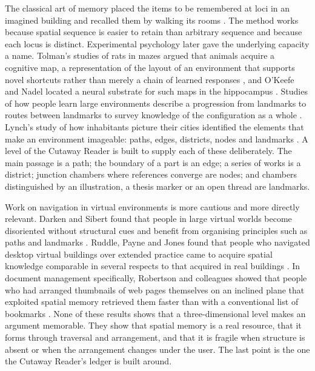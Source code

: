 \documentclass[11pt]{article}
\theoremstyle{remark}
\begin{document}
The classical art of memory placed the items to be remembered at loci in an imagined building and recalled them by walking its rooms \cite{yates1966}. The method works because spatial sequence is easier to retain than arbitrary sequence and because each locus is distinct. Experimental psychology later gave the underlying capacity a name. Tolman's studies of rats in mazes argued that animals acquire a cognitive map, a representation of the layout of an environment that supports novel shortcuts rather than merely a chain of learned responses \cite{tolman1948}, and O'Keefe and Nadel located a neural substrate for such maps in the hippocampus \cite{okeefe1978}. Studies of how people learn large environments describe a progression from landmarks to routes between landmarks to survey knowledge of the configuration as a whole \cite{siegel1975}. Lynch's study of how inhabitants picture their cities identified the elements that make an environment imageable: paths, edges, districts, nodes and landmarks \cite{lynch1960}. A level of the Cutaway Reader is built to supply each of these deliberately. The main passage is a path; the boundary of a part is an edge; a series of works is a district; junction chambers where references converge are nodes; and chambers distinguished by an illustration, a thesis marker or an open thread are landmarks.

Work on navigation in virtual environments is more cautious and more directly relevant. Darken and Sibert found that people in large virtual worlds become disoriented without structural cues and benefit from organising principles such as paths and landmarks \cite{darken1996}. Ruddle, Payne and Jones found that people who navigated desktop virtual buildings over extended practice came to acquire spatial knowledge comparable in several respects to that acquired in real buildings \cite{ruddle1997}. In document management specifically, Robertson and colleagues showed that people who had arranged thumbnails of web pages themselves on an inclined plane that exploited spatial memory retrieved them faster than with a conventional list of bookmarks \cite{robertson1998}. None of these results shows that a three-dimensional level makes an argument memorable. They show that spatial memory is a real resource, that it forms through traversal and arrangement, and that it is fragile when structure is absent or when the arrangement changes under the user. The last point is the one the Cutaway Reader's ledger is built around.
\end{document}
